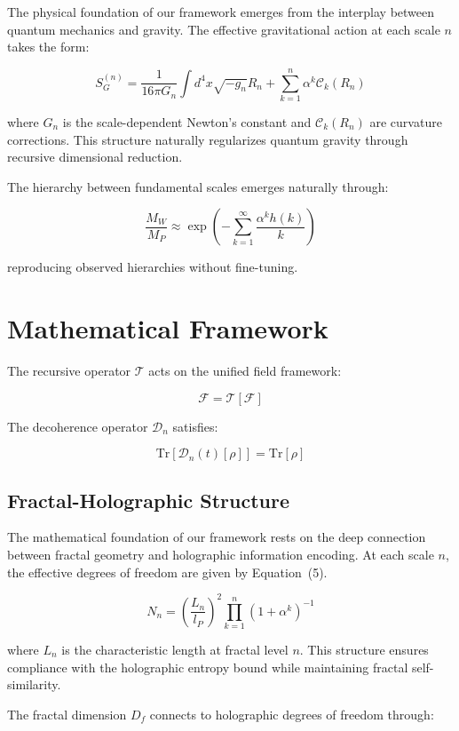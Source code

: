 \documentclass{article}
\begin{document}
The physical foundation of our framework emerges from the interplay between quantum mechanics and gravity. The effective gravitational action at each scale $n$ takes the form:

\[
S_G^{(n)} = \frac{1}{16\pi G_n} \int d^4x \sqrt{-g_n} R_n + \sum_{k=1}^n \alpha^k \mathcal{C}_k(R_n) \tag{4}
\]

where $G_n$ is the scale-dependent Newton's constant and $\mathcal{C}_k(R_n)$ are curvature corrections. This structure naturally regularizes quantum gravity through recursive dimensional reduction.

The hierarchy between fundamental scales emerges naturally through:

\[
\frac{M_W}{M_P} \approx \exp\left(-\sum_{k=1}^{\infty} \frac{\alpha^k h(k)}{k}\right)
\]

reproducing observed hierarchies without fine-tuning.

\section{Mathematical Framework}

The recursive operator $\mathcal{T}$ acts on the unified field framework:

\[
\mathcal{F} = \mathcal{T}[\mathcal{F}]
\]

The decoherence operator $\mathcal{D}_n$ satisfies:

\[
\text{Tr}[\mathcal{D}_n(t)[\rho]] = \text{Tr}[\rho]
\]

\subsection{Fractal-Holographic Structure}

The mathematical foundation of our framework rests on the deep connection between fractal geometry and holographic information encoding. At each scale $n$, the effective degrees of freedom are given by Equation~(5).

\begin{equation}
N_n = \left(\frac{L_n}{l_P}\right)^2 \prod_{k=1}^n (1 + \alpha^k)^{-1}
\end{equation}

where $L_n$ is the characteristic length at fractal level $n$. This structure ensures compliance with the holographic entropy bound while maintaining fractal self-similarity.

The fractal dimension $D_f$ connects to holographic degrees of freedom through:
\end{document}
